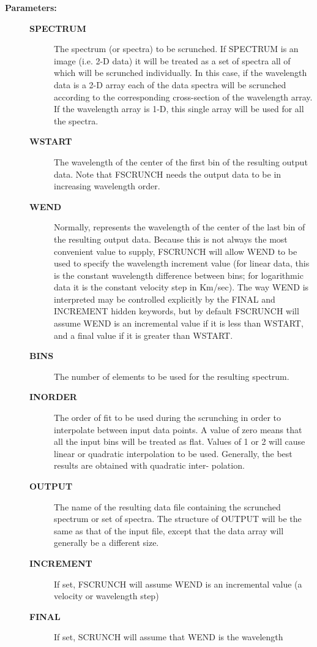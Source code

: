 \begin{description}
\begin{description}
\item [\textbf{Parameters:}]
\begin{description}
\item [\textbf{SPECTRUM}]
 The spectrum (or spectra) to be scrunched.
 If SPECTRUM is an image (i.e. 2-D data) it will be treated
 as a set of spectra all of which will be scrunched
 individually.  In this case, if the wavelength data is
 a 2-D array each of the data spectra will be scrunched
 according to the corresponding cross-section of the
 wavelength array.  If the wavelength array is 1-D, this
 single array will be used for all the spectra.
\item [\textbf{WSTART}]
 The wavelength of the center of the first bin
 of the resulting output data.  Note that FSCRUNCH needs
 the output data to be in increasing wavelength order.
\item [\textbf{WEND}]
 Normally, represents the wavelength of the center of
 the last bin of the resulting output data.  Because this
 is not always the most convenient value to supply, FSCRUNCH
 will allow WEND to be used to specify the wavelength
 increment value (for linear data, this is the constant
 wavelength difference between bins; for logarithmic data
 it is the constant velocity step in Km/sec).  The way
 WEND is interpreted may be controlled explicitly by the
 FINAL and INCREMENT hidden keywords, but by default FSCRUNCH
 will assume WEND is an incremental value if it is less than
 WSTART, and a final value if it is greater than WSTART.
\item [\textbf{BINS}]
 The number of elements to be used for the resulting spectrum.
\item [\textbf{INORDER}]
 The order of fit to be used during the scrunching in
 order to interpolate between input data points.  A
 value of zero means that all the input bins will be
 treated as flat.  Values of 1 or 2 will cause linear
 or quadratic interpolation to be used.  Generally,
 the best results are obtained with quadratic inter-
 polation.
\item [\textbf{OUTPUT}]
 The name of the resulting data file containing the
 scrunched spectrum or set of spectra.  The structure
 of OUTPUT will be the same as that of the input file,
 except that the data array will generally be a
 different size.
\item [\textbf{INCREMENT}]
 If set, FSCRUNCH will assume WEND is an incremental
 value (a velocity or wavelength step)
\item [\textbf{FINAL}]
 If set, SCRUNCH will assume that WEND is the wavelength

\end{description}
\end{description}
\end{description}
